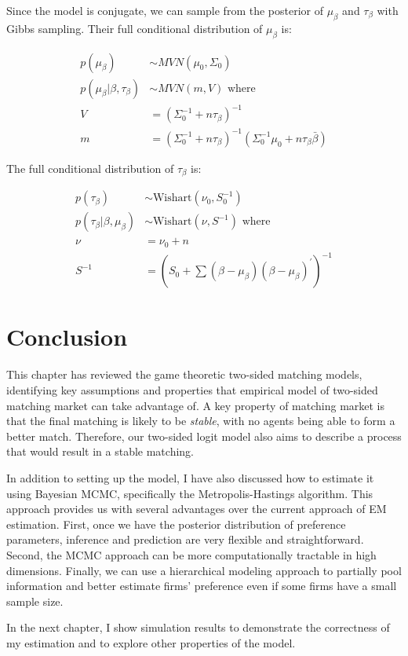 Since the model is conjugate, we can sample from the posterior of $\mu_{\beta}$
and $\tau_{\beta}$ with Gibbs sampling. Their full conditional distribution of
$\mu_{\beta}$ is:

\begin{align}
  p(\mu_{\beta}) &\sim MVN(\mu_0, \Sigma_0) \\
  p(\mu_{\beta} | \beta, \tau_{\beta}) &\sim MVN(m, V) \text{ where } \\
  V &= (\Sigma_0^{-1} + n \tau_{\beta})^{-1} \\
  m &= (\Sigma_0^{-1} + n \tau_{\beta})^{-1} (\Sigma_0^{-1}\mu_0 + n \tau_{\beta} \bar \beta)
\end{align}

The full conditional distribution of $\tau_{\beta}$ is:

\begin{align}
  p(\tau_{\beta}) &\sim \text{Wishart}(\nu_0, S_0^{-1}) \\
  p(\tau_{\beta} | \beta, \mu_{\beta}) &\sim \text{Wishart}(\nu, S^{-1}) \text{ where } \\
  \nu &= \nu_0 + n \\
  S^{-1} &= \left(S_0 + \sum (\beta - \mu_{\beta})(\beta - \mu_{\beta})^{\prime}\right)^{-1}
\end{align}

\section{Conclusion}

This chapter has reviewed the game theoretic two-sided matching models,
identifying key assumptions and properties that empirical model of two-sided
matching market can take advantage of. A key property of matching market is that
the final matching is likely to be \textit{stable}, with no agents being able to
form a better match. Therefore, our two-sided logit model also aims to describe
a process that would result in a stable matching.

In addition to setting up the model, I have also discussed how to estimate it
using Bayesian MCMC, specifically the Metropolis-Hastings algorithm. This
approach provides us with several advantages over the current approach of EM
estimation. First, once we have the posterior distribution of preference
parameters, inference and prediction are very flexible and straightforward.
Second, the MCMC approach can be more computationally tractable in high
dimensions. Finally, we can use a hierarchical modeling approach to partially
pool information and better estimate firms' preference even if some firms have a
small sample size.

In the next chapter, I show simulation results to demonstrate the correctness of
my estimation and to explore other properties of the model.

